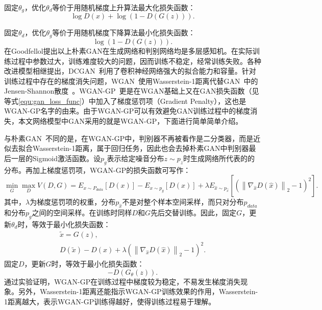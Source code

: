 \noindent 固定$\theta_{g}$，优化$\theta_{d}$等价于用随机梯度上升算法最大化损失函数：
\begin{equation}\label{equ:g_updated_loss_func}
\log D\left(x\right)+\log \left(1-D\left(G\left(z\right)\right)\right).
\end{equation}

\noindent 固定$\theta_{d}$，优化$\theta_{g}$等价于用随机梯度下降算法最小化损失函数：
\begin{equation}
\log \left(1-D\left(G\left(z\right)\right)\right).
\end{equation}
\noindent 在Goodfellol提出以上朴素GAN在生成网络和判别网络均是多层感知机。在实际训练过程中参数过大，训练难度较大的问题，因而训练不稳定，经常训练失败。各种改进模型相继提出，DCGAN~\cite{radford2015unsupervised}利用了卷积神经网络强大的拟合能力和容量。针对训练过程中存在的梯度消失问题，WGAN~\cite{gulrajani2017improved}使用Wasserstein-1距离代替GAN~\cite{goodfellow2014generative}中的Jensen-Shannon散度~\cite{arjovsky2017towards}。WGAN-GP~\cite{gulrajani2017improved}更是在WGAN基础上又在GAN损失函数（见等式\ref{equ:gan_loss_func}）中加入了梯度惩罚项（Gradient Penalty），这也是WGAN-GP名字的由来。由于WGAN-GP可以有效避免GAN训练过程中的梯度消失，本文网络模型中GAN采用的就是WGAN-GP，下面进行简单简单介绍。

与朴素GAN~\cite{goodfellow2014generative}不同的是，在WGAN-GP中，判别器不再被看作是二分类器，而是近似去拟合Wasserstein-1距离，属于回归任务，因此也会去掉朴素GAN中判别器最后一层的Sigmoid激活函数。设$p_g$表示给定噪音分布$z\sim p_z$时生成网络所代表的的分布。再加上梯度惩罚项，WGAN-GP的损失函数可写作：
\begin{equation}\label{wgan_gp_loss_func}
\min _{G} \max _{D} V(D, G)=E_{x \sim P_{d a t a}}[D(x)]-E_{x \sim p_{g}}[D(x)]+\lambda E_{\hat{x} \sim p_{\hat{x}}}\left[\left(\left\|\nabla_{\hat{x}} D(\hat{x})\right\|_{2}-1\right)^{2}\right].
\end{equation}
其中，$\lambda$为梯度惩罚项的权重，分布$p_{\hat{x}}$不是对整个样本空间采样，而只对分布$p_{data}$和分布$p_{g}$之间的空间采样。在训练时同样$D$和$G$先后交替训练。因此，固定$G$，更新$\theta_{d}$时，等效于最小化损失函数：
\begin{gather}
\tilde{{x}} = G_{}({z}), \\
D(\tilde{{x}})-D({x})+\lambda\left(\left\|\nabla_{\hat{x}} D(\hat{x})\right\|_{2}-1\right)^{2}.
\end{gather}
\noindent 固定$D$，更新$G$时，等效于最小化损失函数：
\begin{equation}
-D\left(G_{\theta}(z)\right).
\end{equation}
通过实验证明，WGAN-GP在训练过程中梯度较为稳定，不易发生梯度消失现象。另外，Wasserstein-1距离还能指示WGAN-GP训练效果的作用，Wasserstein-1距离越大，表示WGAN-GP训练得越好，使得训练过程易于理解。
